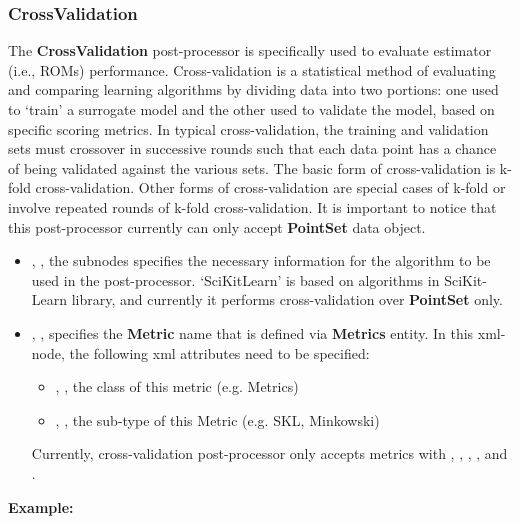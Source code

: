 \subsubsection{CrossValidation}
\label{CVPP}
The \textbf{CrossValidation} post-processor is specifically used to evaluate estimator (i.e., ROMs) performance.
Cross-validation is a statistical method of evaluating and comparing learning algorithms by dividing data into
two portions: one used to `train' a surrogate model and the other used to validate the model, based on specific
scoring metrics. In typical cross-validation, the training and validation sets must crossover in successive
rounds such that each data point has a chance of being validated against the various sets. The basic form of
cross-validation is k-fold cross-validation. Other forms of cross-validation are special cases of k-fold or involve
repeated rounds of k-fold cross-validation. \nb It is important to notice that this post-processor currently can
only accept \textbf{PointSet} data object.
%
%
\begin{itemize}
  \item {}, , the subnodes specifies the necessary information
    for the algorithm to be used in the post-processor. `SciKitLearn' is based on algorithms in SciKit-Learn
    library, and currently it performs cross-validation over \textbf{PointSet} only.
  \item {}, , specifies the \textbf{Metric} name that is defined via
    \textbf{Metrics} entity. In this xml-node, the following xml attributes need to be specified:
    \begin{itemize}
      \item {}, , the class of this metric (e.g. Metrics)
      \item {}, , the sub-type of this Metric (e.g. SKL, Minkowski)
    \end{itemize}
    \nb Currently, cross-validation post-processor only accepts  metrics with 
    , , ,
    , and .
\end{itemize}

\textbf{Example:}

